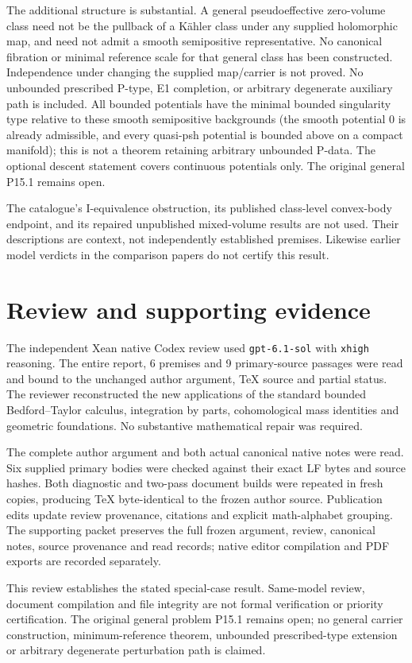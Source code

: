 \documentclass[
  11pt,
]{article}
\begin{document}
The additional structure is substantial. A general pseudoeffective
zero-volume class need not be the pullback of a Kähler class under any
supplied holomorphic map, and need not admit a smooth semipositive
representative. No canonical fibration or minimal reference scale for
that general class has been constructed. Independence under changing the
supplied map/carrier is not proved. No unbounded prescribed P-type, E1
completion, or arbitrary degenerate auxiliary path is included. All
bounded potentials have the minimal bounded singularity type relative to
these smooth semipositive backgrounds (the smooth potential \(0\) is
already admissible, and every quasi-psh potential is bounded above on a
compact manifold); this is not a theorem retaining arbitrary unbounded
P-data. The optional descent statement covers continuous potentials
only. The original general P15.1 remains open.

The catalogue's I-equivalence obstruction, its published class-level
convex-body endpoint, and its repaired unpublished mixed-volume results
are not used. Their descriptions are context, not independently
established premises. Likewise earlier model verdicts in the comparison
papers do not certify this result.

\section*{Review and supporting evidence}

The independent Xean native Codex review used \texttt{gpt-6.1-sol} with
\texttt{xhigh} reasoning. The entire report, 6 premises and
9 primary-source passages were read and bound to the unchanged
author argument, TeX source and partial status. The reviewer reconstructed
the new applications of the standard bounded Bedford--Taylor calculus,
integration by parts, cohomological mass identities and geometric
foundations. No substantive mathematical repair was required.

The complete author argument and both actual canonical native notes were
read. Six supplied primary bodies were checked against their exact LF
bytes and source hashes. Both diagnostic and two-pass document builds
were repeated in fresh copies, producing TeX byte-identical to the frozen
author source. Publication edits update review provenance, citations and
explicit math-alphabet grouping. The supporting packet preserves the
full frozen argument, review, canonical notes, source provenance and read
records; native editor compilation and PDF exports are recorded separately.

This review establishes the stated special-case result. Same-model review,
document compilation and file integrity are not formal verification or
priority certification. The original general problem P15.1 remains open;
no general carrier construction, minimum-reference theorem, unbounded
prescribed-type extension or arbitrary degenerate perturbation path is
claimed.
\end{document}
